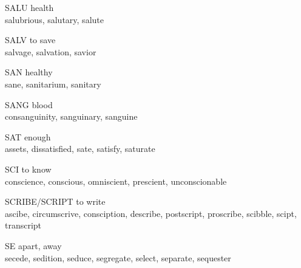 \begin{flashcard}[Roots]{SALU}
health\\
\vspace{0.2in}
salubrious, salutary, salute\\
\end{flashcard}

\begin{flashcard}[Roots]{SALV}
to save\\
\vspace{0.2in}
salvage, salvation, savior\\
\end{flashcard}

\begin{flashcard}[Roots]{SAN}
healthy\\
\vspace{0.2in}
sane, sanitarium, sanitary\\
\end{flashcard}

\begin{flashcard}[Roots]{SANG}
blood\\
\vspace{0.2in}
consanguinity, sanguinary, sanguine\\
\end{flashcard}

\begin{flashcard}[Roots]{SAT}
enough\\
\vspace{0.2in}
assets, dissatisfied, sate, satisfy, saturate\\
\end{flashcard}

\begin{flashcard}[Roots]{SCI}
to know\\
\vspace{0.2in}
conscience, conscious, omniscient, prescient, unconscionable\\
\end{flashcard}

\begin{flashcard}[Roots]{SCRIBE/SCRIPT}
to write\\
\vspace{0.2in}
ascibe, circumscrive, consciption, describe, postscript, proscribe, scibble, scipt, transcript\\
\end{flashcard}

\begin{flashcard}[Roots]{SE}
apart, away\\
\vspace{0.2in}
secede, sedition, seduce, segregate, select, separate, sequester\\
\end{flashcard}


